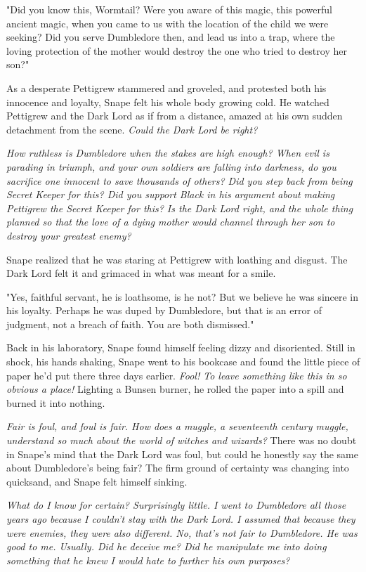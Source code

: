 "Did you know this, Wormtail? Were you aware of this magic, this powerful ancient magic, when you came to us with the location of the child we were seeking? Did you serve Dumbledore then, and lead us into a trap, where the loving protection of the mother would destroy the one who tried to destroy her son?"

As a desperate Pettigrew stammered and groveled, and protested both his innocence and loyalty, Snape felt his whole body growing cold. He watched Pettigrew and the Dark Lord as if from a distance, amazed at his own sudden detachment from the scene. \emph{Could the Dark Lord be right?}

\emph{How ruthless is Dumbledore when the stakes are high enough? When evil is parading in triumph, and your own soldiers are falling into darkness, do you sacrifice one innocent to save thousands of others? Did you step back from being Secret Keeper for this? Did you support Black in his argument about making Pettigrew the Secret Keeper for this? Is the Dark Lord right, and the whole thing planned so that the love of a dying mother would channel through her son to destroy your greatest enemy?}

Snape realized that he was staring at Pettigrew with loathing and disgust. The Dark Lord felt it and grimaced in what was meant for a smile.

"Yes, faithful servant, he is loathsome, is he not? But we believe he was sincere in his loyalty. Perhaps he was duped by Dumbledore, but that is an error of judgment, not a breach of faith. You are both dismissed."

Back in his laboratory, Snape found himself feeling dizzy and disoriented. Still in shock, his hands shaking, Snape went to his bookcase and found the little piece of paper he'd put there three days earlier. \emph{Fool! To leave something like this in so obvious a place!} Lighting a Bunsen burner, he rolled the paper into a spill and burned it into nothing.

\emph{Fair is foul, and foul is fair. How does a muggle, a seventeenth century muggle, understand so much about the world of witches and wizards?} There was no doubt in Snape's mind that the Dark Lord was foul, but could he honestly say the same about Dumbledore's being fair? The firm ground of certainty was changing into quicksand, and Snape felt himself sinking.

\emph{What do I know for certain? Surprisingly little. I went to Dumbledore all those years ago because I couldn't stay with the Dark Lord. I assumed that because they were enemies, they were also different. No, that's not fair to Dumbledore. He was good to me. Usually. Did he deceive me? Did he manipulate me into doing something that he knew I would hate to further his own purposes?}

